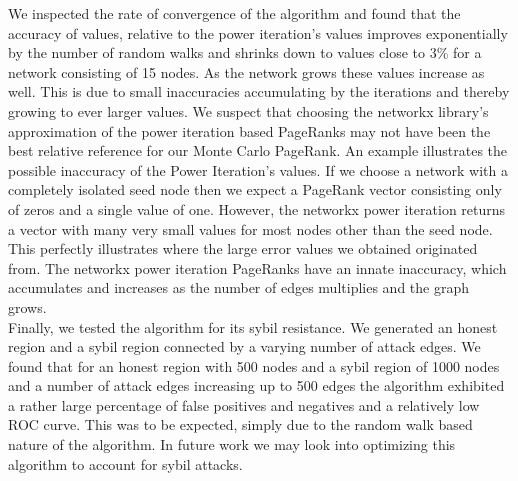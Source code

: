 \documentclass[twocolumn]{article}
\theoremstyle{definition}
\theoremstyle{theorem}
\begin{document}
\noindent We inspected the rate of convergence of the algorithm and found that the accuracy of values, relative to the power iteration's values improves exponentially by the number of random walks and shrinks down to values close to $3\%$ for a network consisting of 15 nodes. As the network grows these values increase as well. This is due to small inaccuracies accumulating by the iterations and thereby growing to ever larger values. We suspect that choosing the networkx library's approximation of the power iteration based PageRanks may not have been the best relative reference for our Monte Carlo PageRank. An example illustrates the possible inaccuracy of the Power Iteration's values. If we choose a network with a completely isolated seed node then we expect a PageRank vector consisting only of zeros and a single value of one. However, the networkx power iteration returns a vector with many very small values for most nodes other than the seed node. This perfectly illustrates where the large error values we obtained originated from. The networkx power iteration PageRanks have an innate inaccuracy, which accumulates and increases as the number of edges multiplies and the graph grows. \vspace{1em}\\

\noindent Finally, we tested the algorithm for its sybil resistance. We generated an honest region and a sybil region connected by a varying number of attack edges. We found that for an honest region with 500 nodes and a sybil region of 1000 nodes and a number of attack edges increasing up to 500 edges the algorithm exhibited a rather large percentage of false positives and negatives and a relatively low ROC curve. This was to be expected, simply due to the random walk based nature of the algorithm. In future work we may look into optimizing this algorithm to account for sybil attacks.
\end{document}
